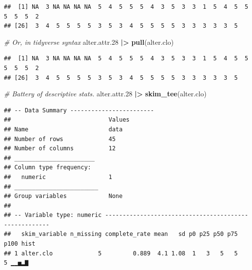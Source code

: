 \documentclass[
]{book}
\newenvironment{Shaded}{\begin{snugshade}}{\end{snugshade}}
\newcommand{\CommentTok}[1]{\textcolor[rgb]{0.56,0.35,0.01}{\textit{#1}}}
\newcommand{\FloatTok}[1]{\textcolor[rgb]{0.00,0.00,0.81}{#1}}
\newcommand{\FunctionTok}[1]{\textcolor[rgb]{0.13,0.29,0.53}{\textbf{#1}}}
\newcommand{\NormalTok}[1]{#1}
\newcommand{\SpecialCharTok}[1]{\textcolor[rgb]{0.81,0.36,0.00}{\textbf{#1}}}
\begin{document}
\begin{Shaded}
\end{Shaded}

\begin{verbatim}
##  [1] NA  3 NA NA NA NA  5  4  5  5  5  4  3  5  3  3  1  5  4  5  5  5  5  5  2
## [26]  3  4  5  5  5  5  3  5  3  4  5  5  5  5  3  3  3  3  3  5
\end{verbatim}

\begin{Shaded}
\begin{Highlighting}[]
\CommentTok{\# Or, in tidyverse syntax}
\NormalTok{alter.attr}\FloatTok{.28} \SpecialCharTok{|\textgreater{}} 
  \FunctionTok{pull}\NormalTok{(alter.clo)}
\end{Highlighting}
\end{Shaded}

\begin{verbatim}
##  [1] NA  3 NA NA NA NA  5  4  5  5  5  4  3  5  3  3  1  5  4  5  5  5  5  5  2
## [26]  3  4  5  5  5  5  3  5  3  4  5  5  5  5  3  3  3  3  3  5
\end{verbatim}

\begin{Shaded}
\begin{Highlighting}[]
\CommentTok{\# Battery of descriptive stats.}
\NormalTok{alter.attr}\FloatTok{.28} \SpecialCharTok{|\textgreater{}}
  \FunctionTok{skim\_tee}\NormalTok{(alter.clo) }
\end{Highlighting}
\end{Shaded}

\begin{verbatim}
## -- Data Summary ------------------------
##                            Values
## Name                       data  
## Number of rows             45    
## Number of columns          12    
## _______________________          
## Column type frequency:           
##   numeric                  1     
## ________________________         
## Group variables            None  
## 
## -- Variable type: numeric ------------------------------------------------------
##   skim_variable n_missing complete_rate mean   sd p0 p25 p50 p75 p100 hist 
## 1 alter.clo             5         0.889  4.1 1.08  1   3   5   5    5 ▁▁▅▂▇
\end{verbatim}
\end{document}
